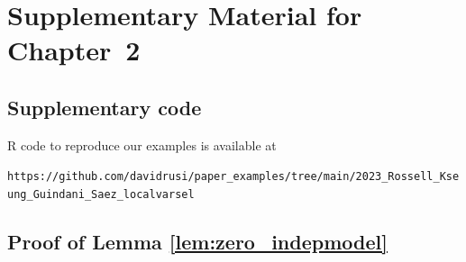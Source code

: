 \newtheorem{defn}{Definition}
\newtheorem{exercise}{Exercise}

\renewcommand{\thethm}{S\arabic{thm}}
\renewcommand{\theprop}{S\arabic{prop}}
\renewcommand{\thelemma}{S\arabic{lemma}}
\renewcommand{\thefigure}{S\arabic{figure}}
\renewcommand{\thetable}{S\arabic{table}}
\renewcommand{\thesection}{S\arabic{section}}
\renewcommand{\theequation}{S\arabic{equation}}



\chapter{Supplementary Material for Chapter~2}
\label{chap:appendix}


\section{Supplementary code}

R code to reproduce our examples is available at

{\small \texttt{https://github.com/davidrusi/paper\_examples/tree/main/2023\_Rossell\_Kseung\_Guindani\_Saez\_localvarsel}}


\section{Proof of Lemma \ref{lem:zero_indepmodel}}
\label{supplsec:proof_zero_indepmodel}


